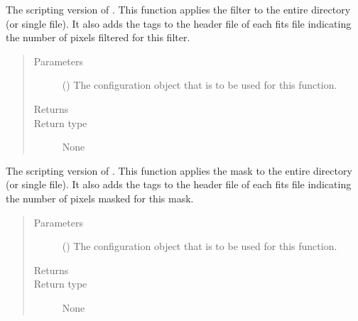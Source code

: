 \documentclass[letterpaper,10pt,english]{sphinxmanual}
\begin{document}
\begin{fulllineitems}
\label{\detokenize{docstrings/ifa_smeargle.masking.scripting:ifa_smeargle.masking.scripting.script_filter_sigma_value}}
The scripting version of . This
function applies the filter to the entire directory (or single
file). It also adds the tags to the header file of each fits file
indicating the number of pixels filtered for this filter.
\begin{quote}\begin{description}
\item[{Parameters}] \leavevmode
{} () \textendash{} The configuration object that is to be used for this
function.

\item[{Returns}] \leavevmode


\item[{Return type}] \leavevmode
None

\end{description}\end{quote}

\end{fulllineitems}


\begin{fulllineitems}
\label{\detokenize{docstrings/ifa_smeargle.masking.scripting:ifa_smeargle.masking.scripting.script_mask_columns}}
The scripting version of . This function
applies the mask to the entire directory (or single file). It
also adds the tags to the header file of each fits file
indicating the number of pixels masked for this mask.
\begin{quote}\begin{description}
\item[{Parameters}] \leavevmode
{} () \textendash{} The configuration object that is to be used for this
function.

\item[{Returns}] \leavevmode


\item[{Return type}] \leavevmode
None

\end{description}\end{quote}

\end{fulllineitems}
\end{document}
